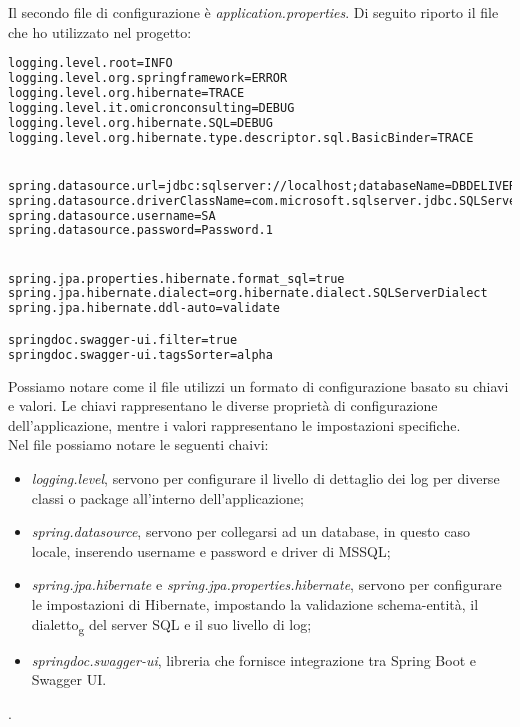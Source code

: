 \noindent Il secondo file di configurazione è \textit{application.properties}. Di seguito riporto il file che ho utilizzato nel progetto:
\begin{lstlisting}[language = XML, caption = application.properties del progetto]
logging.level.root=INFO
logging.level.org.springframework=ERROR
logging.level.org.hibernate=TRACE
logging.level.it.omicronconsulting=DEBUG
logging.level.org.hibernate.SQL=DEBUG
logging.level.org.hibernate.type.descriptor.sql.BasicBinder=TRACE


spring.datasource.url=jdbc:sqlserver://localhost;databaseName=DBDELIVERONE;Trusted_Connection=False;\MultipleActiveResultSets=true;encrypt=true;trustServerCertificate=true;
spring.datasource.driverClassName=com.microsoft.sqlserver.jdbc.SQLServerDriver
spring.datasource.username=SA
spring.datasource.password=Password.1


spring.jpa.properties.hibernate.format_sql=true
spring.jpa.hibernate.dialect=org.hibernate.dialect.SQLServerDialect
spring.jpa.hibernate.ddl-auto=validate

springdoc.swagger-ui.filter=true
springdoc.swagger-ui.tagsSorter=alpha
\end{lstlisting}
Possiamo notare come il file utilizzi un formato di configurazione basato su chiavi e valori. Le chiavi rappresentano le diverse proprietà di configurazione dell'applicazione, mentre i valori rappresentano le impostazioni specifiche.\\
Nel file possiamo notare le seguenti chaivi:
\begin{itemize}
\item \textit{logging.level}, servono per configurare il livello di dettaglio dei log per diverse classi o package all'interno dell'applicazione;
\item \textit{spring.datasource}, servono per collegarsi ad un database, in questo caso locale, inserendo username e password e driver di MSSQL;
\item \textit{spring.jpa.hibernate} e \textit{spring.jpa.properties.hibernate}, servono per configurare le impostazioni di Hibernate, impostando la validazione schema-entità, il dialetto\textsubscript{g} del server SQL e il suo livello di log;
\item \textit{springdoc.swagger-ui}, libreria che fornisce integrazione tra Spring Boot e Swagger UI.  
\end{itemize}. 